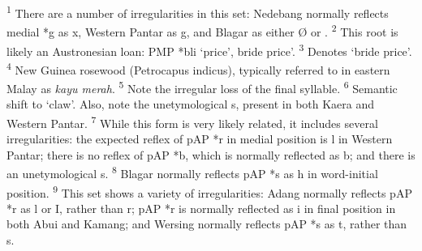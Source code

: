 \textsuperscript{1} There are a number of irregularities in this set: Nedebang normally reflects medial *g as x, Western Pantar as g{\textlengthmark}, and Blagar as either {\O} or {\textglotstop}.\textsuperscript{  2} This root is likely an Austronesian loan: PMP *b{\textschwa}li `price', bride price'.  \textsuperscript{3} Denotes `bride price'.  \textsuperscript{4} New Guinea rosewood (Petrocapus indicus), typically referred to in eastern Malay as \textit{kayu merah}.  \textsuperscript{5} Note the irregular loss of the final syllable.  \textsuperscript{6} Semantic shift to `claw'. Also, note the unetymological s, present in both Kaera and Western Pantar.  \textsuperscript{7} While this form is very likely related, it includes several irregularities: the expected reflex of pAP *r in medial position is l in Western Pantar; there is no reflex of pAP *b, which is normally reflected as b; and there is an unetymological s.  \textsuperscript{8} Blagar normally reflects pAP *s as h in word-initial position.  \textsuperscript{9} This set shows a variety of irregularities: Adang normally reflects pAP *r as l or I, rather than r; pAP *r is normally reflected as i in final position in both Abui and Kamang; and Wersing normally reflects pAP *s as t, rather than s.




